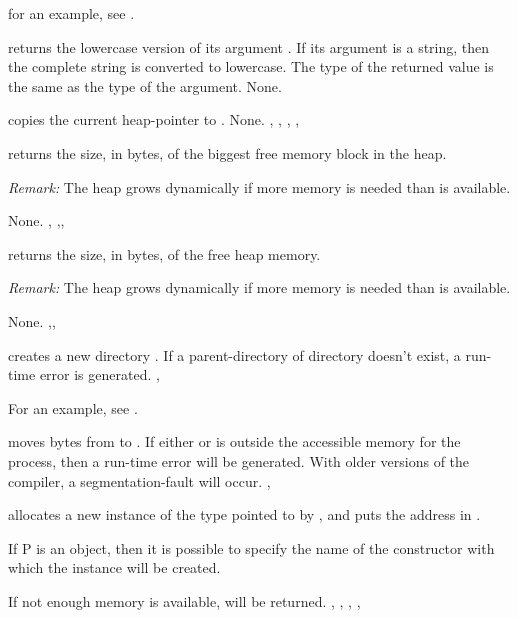 \documentclass{report}
\begin{document}
for an example, see .

{ returns the lowercase version of its argument .
If its argument is a string, then the complete string is converted to
lowercase. The type of the returned value is the same as the type of the
argument.}
{None.}
{}

\html{}

{ copies the current heap-pointer to .}
{None.}
{, , , , }

\html{}

{ returns the size, in bytes, of the biggest free memory block in
the heap.

{\em Remark:} The heap grows dynamically if more memory is needed than is
available.}
{None.}
{, ,, }

\html{}

{ returns the size, in bytes, of the free heap memory.

{\em Remark:} The heap grows dynamically if more memory is needed than is
available.}
{None.}
{,, }

\html{}

{ creates a new  directory .}
{If a parent-directory of directory  doesn't exist, a run-time error is generated.}
{, }

For an example, see .

{ moves  bytes from  to .}
{If either  or  is outside the accessible memory for
the process, then a run-time error will be generated. With older versions of
the compiler, a segmentation-fault will occur. }
{, }

\html{}


{ allocates a new instance of the type pointed to by , and
puts the address in . 

If P is an object, then it is possible to
specify the name of the constructor with which the instance will be created.}
{If not enough memory is available,  will be returned.}
{, , , ,
}
\end{document}
